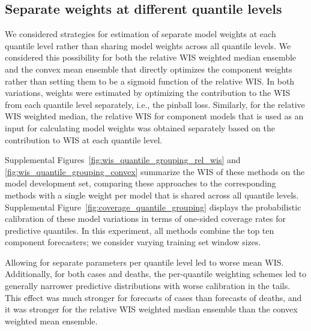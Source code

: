 \documentclass{article}
\begin{document}
\newpage

\subsection{Separate weights at different quantile levels}

We considered strategies for estimation of separate model weights at each quantile level rather than sharing model weights across all quantile levels.
We considered this possibility for both the relative WIS weighted median ensemble and the convex mean ensemble that directly optimizes the component weights rather than setting them to be a sigmoid function of the relative WIS.
In both variations, weights were estimated by optimizing the contribution to the WIS from each quantile level separately, i.e., the pinball loss.
Similarly, for the relative WIS weighted median, the relative WIS for component models that is used as an input for calculating model weights was obtained separately based on the contribution to WIS at each quantile level.

Supplemental Figures~\ref{fig:wis_quantile_grouping_rel_wis} and \ref{fig:wis_quantile_grouping_convex} summarize the WIS of these methods on the model development set, comparing these approaches to the corresponding methods with a single weight per model that is shared across all quantile levels. Supplemental Figure~\ref{fig:coverage_quantile_grouping} displays the probabilistic calibration of these model variations in terms of one-sided coverage rates for predictive quantiles. In this experiment, all methods combine the top ten component forecasters; we consider varying training set window sizes.

Allowing for separate parameters per quantile level led to worse mean WIS. Additionally, for both cases and deaths, the per-quantile weighting schemes led to generally narrower predictive distributions with worse calibration in the tails. This effect was much stronger for forecasts of cases than forecasts of deaths, and it was stronger for the relative WIS weighted median ensemble than the convex weighted mean ensemble.
\end{document}
